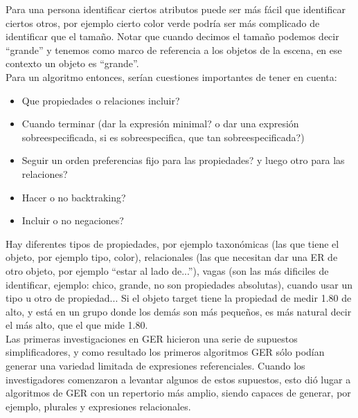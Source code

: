 Para una persona identificar ciertos atributos puede ser m\'as f\'acil que identificar ciertos otros, por ejemplo cierto color verde podr\'{i}a ser m\'as complicado de identificar que el tama\~no. Notar que cuando decimos el tama\~no podemos decir ``grande'' y tenemos como marco de referencia a los objetos de la escena, en ese contexto un objeto es ``grande''.\\

Para un algoritmo entonces, ser\'ian cuestiones importantes de tener en cuenta:

\begin{itemize}
 \item Que propiedades o relaciones incluir?
 \item Cuando terminar (dar la expresi\'on minimal? o dar una expresi\'on sobreespecificada, si es sobreespecifica, que tan sobreespecificada?)
 \item Seguir un orden preferencias fijo para las propiedades? y luego otro para las relaciones?
 \item Hacer o no backtraking?
 \item Incluir o no negaciones?
\end{itemize}


Hay diferentes tipos de propiedades, por ejemplo taxon\'omicas (las que tiene el objeto, por ejemplo tipo, color), relacionales (las que necesitan dar una ER de otro objeto, por ejemplo ``estar al lado de...''), vagas (son las m\'as dificiles de identificar, ejemplo: chico, grande, no son propiedades absolutas), cuando usar un tipo u otro de propiedad... 
Si el objeto target tiene la propiedad de medir 1.80 de alto, y est\'a en un grupo donde los dem\'as son m\'as peque\~nos, es m\'as natural decir el m\'as alto, que el que mide 1.80.\\



%
Las primeras investigaciones en GER hicieron una serie de supuestos simplificadores, y como resultado los primeros
algoritmos GER s\'olo pod\'ian generar una variedad limitada de expresiones referenciales. Cuando
los investigadores comenzaron a levantar algunos de estos supuestos, esto di\'o lugar a algoritmos de GER
con un repertorio m\'as amplio, siendo capaces de generar, por ejemplo, plurales y expresiones relacionales. \\

